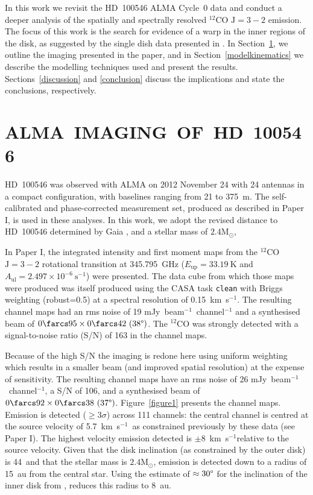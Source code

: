 \documentclass[onecolumn]{aastex6}
\newcommand{\kms}{km~s$^{-1}$}
\newcommand{\perbeam}{beam$^{-1}$}
\begin{document}
In this work we revisit the HD~100546 ALMA Cycle~0 data and conduct a deeper analysis 
of the spatially and spectrally resolved $^{12}$CO $\mathrm{J}=3-2$ emission.  
The focus of this work is the search for evidence of a warp in the inner 
regions of the disk, as suggested by the single dish data presented in 
\citet{panic10}. 
In Section~\ref{almaimages}, we outline the imaging presented 
in the paper, and in 
Section~\ref{modelkinematics} we describe the modelling techniques 
used and present the results.  
Sections~\ref{discussion} and \ref{conclusion} discuss the implications 
and state the conclusions, respectively.  

\section{ALMA~IMAGING~OF~HD~100546 }
\label{almaimages}

HD~100546 was observed with ALMA on 2012 November 24 with 
24 antennas in a compact configuration, with baselines 
ranging from 21 to 375~m.  
The self-calibrated and phase-corrected 
measurement set, produced as described in Paper I, 
is used in these analyses.  
In this work, we adopt the revised distance to 
HD~100546 determined by Gaia \citep[$109\pm4$ pc,][]{gaia16a,gaia16b}, 
and a stellar mass of $2.4 \mathrm{M}_{\odot}$, \citep{vandenancker98}

In Paper I, the integrated intensity
and first moment maps from the $^{12}$CO $\mathrm{J}=3-2$ rotational 
transition at 345.795~GHz ($E_\mathrm{up} = 33.19~\mathrm{K}$ 
and $A_\mathrm{ul} = 2.497\times 10^{-6}~\mathrm{s}^{-1}$) were presented.  
The data cube from which those maps were produced was itself produced 
using the CASA task \texttt{clean} with Briggs weighting (robust=0.5) 
at a spectral resolution of 0.15~\kms.  
The resulting channel maps had an rms noise of 19 mJy~\perbeam~channel$^{-1}$ 
and a synthesised beam of $0\farcs95\times0\farcs42~(38\degree)$.  
The $^{12}$CO was strongly detected with a signal-to-noise ratio 
(S/N) of 163 in the channel maps.   

Because of the high S/N the imaging is redone here 
using uniform weighting which results in a smaller beam (and improved  
spatial resolution) at the expense of sensitivity.  
The resulting channel maps have an rms noise of 26 
mJy~beam$^{-1}$~channel$^{-1}$, a S/N of 106, and 
a synthesised beam of $0\farcs92\times0\farcs38~(37\degree)$.   
Figure~\ref{figure1} presents the channel maps.  
Emission is detected ($\ge 3\sigma$) across 111 channels: the central channel 
is centred at the source velocity of 5.7~\kms~as constrained 
previously by these data (see Paper I).  
The highest velocity emission detected is $\pm 8$~\kms relative 
to the source velocity.
Given that the disk inclination (as constrained by the outer disk) 
is 44\degree~and that the stellar mass is $2.4 \mathrm{M}_\odot$, 
emission is detected down to a radius of 15~au from the central star. 
Using the estimate of $\approx 30\degree$ for the inclination of the 
inner disk from \citet{pineda14}, reduces this radius to 8~au.  
\end{document}
